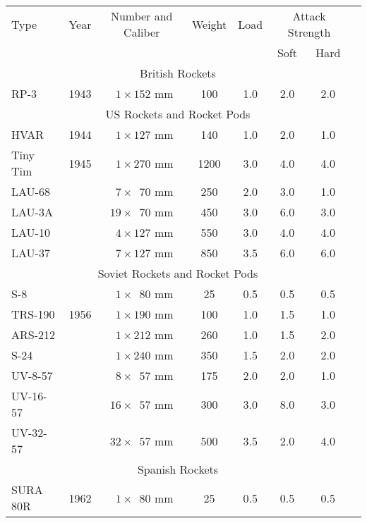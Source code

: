 \begin{twocolumntablefloat}
\begin{twocolumntable}
\begin{tabular}{lrcccccl}
\toprule
Type&
Year&
Number and Caliber&
Weight&
Load&
\multicolumn{2}{c}{Attack Strength}\\
\cmidrule{6-7}
&&&&&Soft&Hard\\
\midrule
\multicolumn{7}{c}{British Rockets}\\
\midrule
RP-3     &1943&$\phantom{0}1 \times \phantom{}152$ mm&\phantom{0}100&1.0&2.0&2.0\\
\midrule
\multicolumn{7}{c}{US Rockets and Rocket Pods}\\
\midrule
HVAR     &1944&$\phantom{0}1 \times \phantom{}127$ mm&\phantom{0}140&1.0&2.0&1.0\\
Tiny Tim &1945&$\phantom{0}1 \times \phantom{}270$ mm&\phantom{}1200&3.0&4.0&4.0\\
LAU-68   &    &$\phantom{0}7 \times \phantom{0}70$ mm&\phantom{0}250&2.0&3.0&1.0\\
LAU-3A   &    &$\phantom{}19 \times \phantom{0}70$ mm&\phantom{0}450&3.0&6.0&3.0\\
LAU-10   &    &$\phantom{0}4 \times \phantom{}127$ mm&\phantom{0}550&3.0&4.0&4.0\\
LAU-37   &    &$\phantom{0}7 \times \phantom{}127$ mm&\phantom{0}850&3.5&6.0&6.0\\
\midrule
\multicolumn{7}{c}{Soviet Rockets and Rocket Pods}\\
\midrule
S-8      &    &$\phantom{0}1 \times \phantom{0}80$ mm&\phantom{00}25&0.5&0.5&0.5\\
TRS-190  &1956&$\phantom{0}1 \times \phantom{}190$ mm&\phantom{0}100&1.0&1.5&1.0\\
ARS-212  &    &$\phantom{0}1 \times \phantom{}212$ mm&\phantom{0}260&1.0&1.5&2.0\\
S-24     &    &$\phantom{0}1 \times \phantom{}240$ mm&\phantom{0}350&1.5&2.0&2.0\\
UV-8-57  &    &$\phantom{0}8 \times \phantom{0}57$ mm&\phantom{0}175&2.0&2.0&1.0\\
UV-16-57 &    &$\phantom{}16 \times \phantom{0}57$ mm&\phantom{0}300&3.0&8.0&3.0\\
UV-32-57 &    &$\phantom{}32 \times \phantom{0}57$ mm&\phantom{0}500&3.5&2.0&4.0\\
\midrule
\multicolumn{7}{c}{Spanish Rockets}\\
\midrule
SURA 80R &1962&$\phantom{0}1 \times \phantom{0}80$ mm&\phantom{00}25&0.5&0.5&0.5\\
\bottomrule
\end{tabular}
\end{twocolumntable}
\end{twocolumntablefloat}
